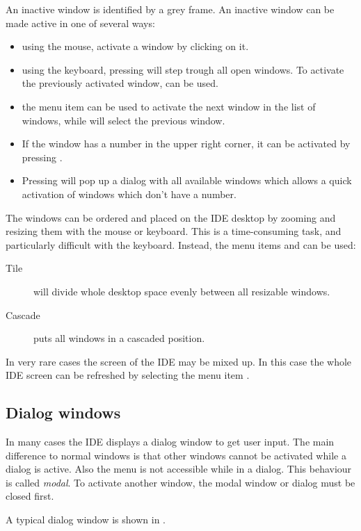 An inactive window is identified by a grey frame. An inactive window can
be made active in one of several ways:
\begin{itemize}
\item using the mouse, activate a window by clicking on it.
\item using the keyboard, pressing  will step trough all open
windows. To activate the previously activated window,  can
be used.
\item the menu item  can be used to activate the next
window in the list of windows, while  will select
the previous window.
\item If the window has a number in the upper right corner, it can be
activated by pressing .
\item Pressing  will pop up a dialog with all
available windows which allows a quick activation of windows which
don't have a number.
\end{itemize}

The windows can be ordered and placed on the IDE desktop by zooming and
resizing them with the mouse or keyboard. This is a time-consuming task,
and particularly difficult with the keyboard. Instead, the menu items
 and  can be used:
\begin{description}
\item[Tile] will divide whole desktop space evenly between all resizable
windows.
\item[Cascade] puts all windows in a cascaded position.
\end{description}

In very rare cases the screen of the IDE may be mixed up. In this
case the whole IDE screen can be refreshed by selecting the menu item
.
%
%
\subsection{Dialog windows}
\label{se:dialogwindow}
In many cases the IDE displays a dialog window to get user input.
The main difference to normal windows is that other windows cannot be
activated while a dialog is active. Also the menu is not accessible while in
a dialog. This behaviour is called \emph{modal}. To activate another window,
the modal window or dialog must be closed first.

A typical dialog window is shown in .

